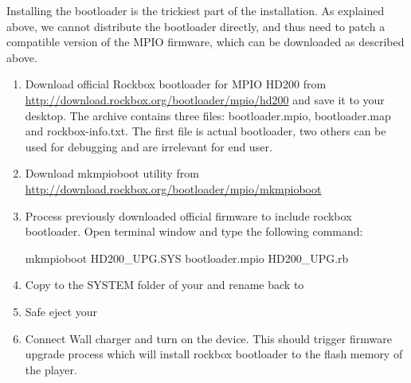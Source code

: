
  Installing the bootloader is the trickiest part of the installation.
  As explained above, we cannot distribute the bootloader directly, and
  thus need to patch a compatible version of the MPIO firmware, which
  can be downloaded as described above.


\begin{enumerate}
   \item Download official Rockbox bootloader for MPIO HD200 from
   \url {http://download.rockbox.org/bootloader/mpio/hd200}
   and save it to your desktop. The archive contains three files: bootloader.mpio, 
   bootloader.map and rockbox-info.txt. The first file is actual bootloader, two
   others can be used for debugging and are irrelevant for end user.
   \item Download mkmpioboot utility from \url{http://download.rockbox.org/bootloader/mpio/mkmpioboot}
   \item Process previously downloaded official firmware to include rockbox bootloader.
   Open terminal window and type the following command:
     \begin{code}
       mkmpioboot HD200_UPG.SYS bootloader.mpio HD200_UPG.rb
     \end{code}
   \item Copy  to the SYSTEM folder of your \dap{} and rename back to
   \item Safe eject your \dap{}
   \item Connect Wall charger and turn on the device. This should trigger firmware
   upgrade process which will install rockbox bootloader to the flash memory of the
   player.
\end{enumerate}
